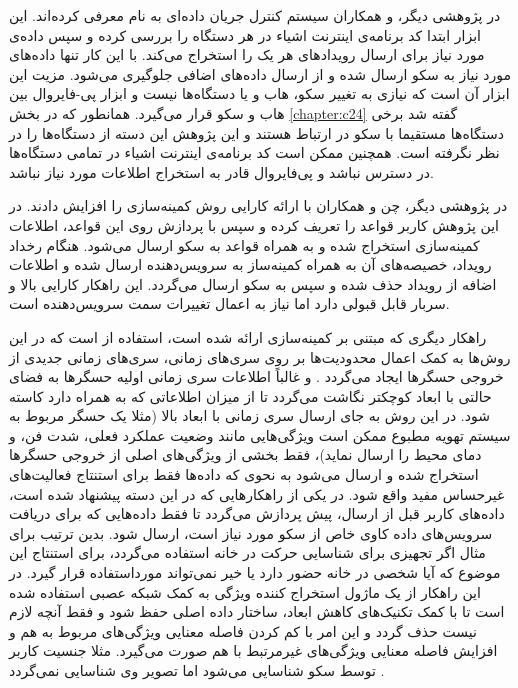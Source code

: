 در پژوهشی دیگر،  و همکاران \cite{x3312} سیستم کنترل جریان داده‌ای به نام  معرفی کرده‌اند. این ابزار ابتدا کد برنامه‌ی اینترنت اشیاء در هر دستگاه را بررسی کرده و سپس داده‌ی مورد نیاز برای ارسال رویدادهای هر یک را استخراج می‌کند. با این کار تنها داده‌های مورد نیاز به سکو ارسال شده و از ارسال داده‌های اضافی جلوگیری می‌شود. مزیت این ابزار آن است که نیازی به تغییر سکو، هاب و یا دستگاه‌ها نیست و ابزار پی-فایروال بین هاب و سکو قرار می‌گیرد. همانطور که در بخش \ref{chapter:c24} گفته شد برخی دستگاه‌ها مستقیما با سکو در ارتباط هستند و این پژوهش این دسته از دستگاه‌ها را در نظر نگرفته است. همچنین ممکن است کد برنامه‌ی اینترنت اشیاء در تمامی دستگاه‌ها در دسترس نباشد و پی‌فایروال قادر به استخراج اطلاعات مورد نیاز نباشد.

در پژوهشی دیگر، چن و همکاران \cite{x3121Z} با ارائه  کارایی روش کمینه‌سازی را افزایش دادند. در این پژوهش کاربر قواعد را تعریف کرده و سپس با پردازش روی این قواعد، اطلاعات کمینه‌سازی استخراج شده و به همراه قواعد به سکو ارسال می‌شود. هنگام رخداد رویداد، خصیصه‌های آن به همراه کمینه‌ساز به سرویس‌دهنده ارسال شده و اطلاعات اضافه از رویداد حذف شده و سپس به سکو ارسال می‌گردد. این راهکار کارایی بالا و سربار قابل قبولی دارد اما نیاز به اعمال تغییرات سمت سرویس‌دهنده است.

راهکار دیگری که مبتنی بر کمینه‌سازی ارائه شده است، استفاده از  است که در این روش‌ها به کمک اعمال محدوديت‌ها بر روی سری‌‌‌های زمانی، سری‌‌‌های زمانی جديدی از خروجی حسگرها ايجاد می‌‌‌گردد \cite{x3131}. و غالباً اطلاعات سری زمانی اوليه حسگرها به فضای حالتی با ابعاد کوچکتر نگاشت می‌گردد تا از ميزان اطلاعاتی که به همراه دارد کاسته شود. در اين روش به جای ارسال سری زمانی با ابعاد بالا (مثلا یک حسگر مربوط به سیستم تهویه مطبوع ممکن است ويژگی‌‌‌هایی مانند وضعیت عملکرد فعلی، شدت فن، و دمای محیط را ارسال نماید)، فقط بخشی از ویژگی‌های اصلی از خروجی حسگرها استخراج شده و ارسال می‌‌‌شود به نحوی که داده‌‌‌ها فقط برای استنتاج فعاليت‌های غيرحساس مفيد واقع شود. در یکی از راهکارهایی که در این دسته پیشنهاد شده است، داده‌‌‌های کاربر قبل از ارسال، پیش پردازش می‌‌‌گردد تا فقط داده‌‌‌هایی که برای دريافت سرویس‌‌‌های داده کاوی خاص از سکو مورد نیاز است، ارسال شود. بدین ترتیب برای مثال اگر تجهیزی برای شناسایی حرکت در خانه استفاده می‌‌‌گردد، برای استنتاج این موضوع که آیا شخصی در خانه حضور دارد یا خیر نمی‌تواند مورداستفاده قرار گیرد. در این راهکار از يک ماژول استخراج کننده ويژگی به کمک شبکه عصبی استفاده شده است تا با کمک تکنیک‌های کاهش ابعاد، ساختار داده اصلی حفظ شود و فقط آنچه لازم نیست حذف گردد و این امر با کم کردن فاصله معنایی ويژگی‌‌‌های مربوط به هم و افزایش فاصله معنایی ويژگی‌‌‌های غیرمرتبط با هم صورت می‌‌‌گیرد. مثلا جنسیت کاربر توسط سکو شناسایی می‌‌‌شود اما تصویر وی شناسایی نمی‌‌‌گردد \cite{x3131}. 

